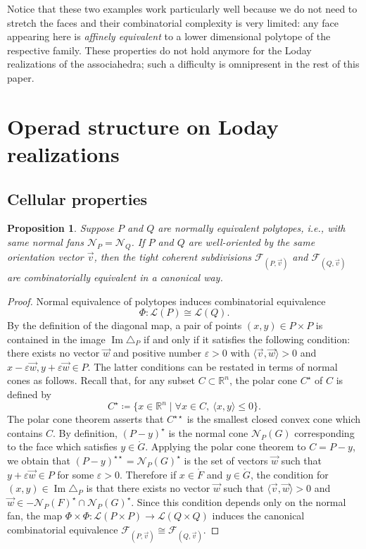 \documentclass[11pt]{article}
\newcommand{\ie}{i.e.,\xspace}
\newcommand{\Subsection}{\subsection}
\numberwithin{equation}{section}\providecommand{\No}{}
\let\mathcal\mathscr
\theoremstyle{plain}
\newtheorem{proposition}{Proposition}
\theoremstyle{definition}
\newcommand{\RR}{\mathbb{R}}
\newcommand{\La}{\mathcal{L}}
\newcommand{\sF}{\mathcal{F}}
\newcommand{\ang}[1]{\langle #1\rangle}
\renewcommand{\No}{\mathcal{N}}
\DeclareMathOperator{\im}{\mathrm{Im}}
\begin{document}
Notice that these two examples work particularly well because we do not need to stretch the faces and their combinatorial complexity is very limited: any face appearing here is \emph{affinely equivalent} to a lower dimensional polytope of the respective family. These properties do not hold anymore for the Loday realizations of the associahedra; such a difficulty is omnipresent in the rest of this paper.

\section{Operad structure on Loday realizations}

\Subsection{Cellular properties}
\begin{proposition}\label{Prop:NormalFan}
Suppose $P$ and $Q$ are normally equivalent polytopes,
\ie with same normal fans $\No_P=\No_Q$.
If $P$ and $Q$ are well-oriented by the same orientation vector $\vec v$,
then the tight coherent subdivisions
$\sF_{(P, \vec v)}$ and $\sF_{(Q, \vec v)}$ are combinatorially equivalent in a canonical way.
\end{proposition}

\begin{proof}
Normal equivalence of polytopes induces combinatorial equivalence
\[
\Phi: \La(P)\cong\La(Q).
\]
By the definition of the diagonal map, a pair of points $(x, y)\in P\times P$ is contained in the image $\im \triangle_P$ if and only if it satisfies the following condition:
there exists no vector $\vec w$ and positive number $\varepsilon >0$ with $\ang{\vec v, \vec w}>0$ and $x-\varepsilon \vec w, y+\varepsilon\vec w\in P$.
The latter conditions can be restated in terms of normal cones as follows. Recall that,
for any subset $C \subset \RR^n$, the polar cone $C^\star$ of $C$ is defined by
\[
C^\star \coloneqq\{ x\in \RR^n\mid \forall x\in C, \ \ang{x, y} \leq 0\}.
\]
The polar cone theorem asserts that $C^{\star \star}$ is the smallest closed convex cone which contains $C$.
By definition, $(P-y)^\star$ is the normal cone $\No_P(G)$ corresponding to the face which satisfies $y\in \mathring G$.
Applying the polar cone theorem to $C= P-y$, we obtain that $(P-y)^{\star\star} = \No_P(G)^\star$ is the set of vectors $\vec w$ such that $y+\varepsilon\vec w \in P$ for some $\varepsilon >0$.
Therefore if $x\in \mathring F$ and $y\in \mathring G$, the condition for $(x, y)\in \im \triangle_P$ is that
there exists no vector $\vec w$ such that
$\ang{\vec v, \vec w}>0$ and $\vec w\in -\No_P(F)^\star\cap \No_P(G)^\star$.
Since this condition depends only on the normal fan,
the map $\Phi\times \Phi: \La(P\times P)\to \La(Q\times Q)$ induces the canonical combinatorial equivalence $\sF_{(P, \vec v)}\cong \sF_{(Q, \vec v)}$.
\end{proof}
\end{document}
